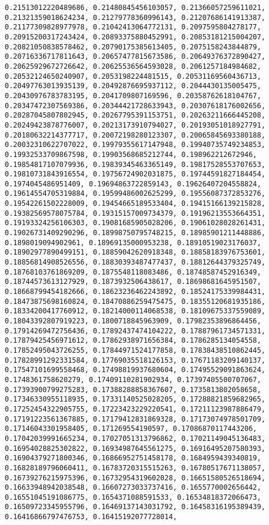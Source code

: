 \documentclass[11pt]{article}
\begin{document}
\begin{Verbatim}[commandchars=\\\{\}]
0.21513012220489686, 0.21480845456103057, 0.21366057259611021, 0.21321359018624234, 0.21279778360996143, 0.21207686141913387, 0.21177309828977978, 0.21042413064772131, 0.2097595804278177, 0.20915200317243424, 0.20893375880452991, 0.20853181215004207, 0.20821050838578462, 0.20790175385613405, 0.2075158243844879, 0.20716336717811643, 0.20657477815673586, 0.20649376372890427, 0.20625929672726642, 0.20625536564593028, 0.2061257184984682, 0.20532124650240907, 0.2053198224481515, 0.20531169560436713, 0.20497763013935139, 0.20492876695937112, 0.2044430135005475, 0.20430976783783195, 0.2041709807169596, 0.20358762618104767, 0.20347472307569386, 0.20344421728633943, 0.20307618176002656, 0.20287045807802945, 0.20267795391153751, 0.20263211666445208, 0.20249423878776007, 0.20213173910794027, 0.20193051018927791, 0.20180632214377717, 0.20072198280123307, 0.20065845693380188, 0.20032310622707022, 0.19979355617147948, 0.19940735749234853, 0.19932533709867598, 0.19903568685212744, 0.198962212672946, 0.19854817107079936, 0.19839345463365149, 0.19817528553707653, 0.19810731843916554, 0.19756724902031875, 0.19744591827184454, 0.1974045486951409, 0.19694863722859143, 0.19626407204558824, 0.19614554705319884, 0.19599486002625299, 0.19556087372853276, 0.19542261502228009, 0.19454665189533404, 0.19415166139215828, 0.19382569578075784, 0.19315157009734379, 0.19196213553664351, 0.19193324256106303, 0.19081685905028206, 0.19061028028261431, 0.19026731409290296, 0.18998750795748215, 0.18985901211448886, 0.1898019094902961, 0.18969135000953238, 0.18910519023176037, 0.18902977890499151, 0.18859042620918348, 0.18858183976753601, 0.18856814908526556, 0.18830393487477437, 0.18812644379325749, 0.18768103761869209, 0.1875548118083486, 0.18748587452916349, 0.18744573613127929, 0.1873932506438617, 0.18698681645951507, 0.18668799454182666, 0.18623236462243892, 0.18524175339984431, 0.18473875698160824, 0.18470886259475475, 0.18355120681935186, 0.18334200417760912, 0.18214000114068538, 0.18109675337559089, 0.18043392807919223, 0.1800718845963909, 0.17982353896864456, 0.17914269472756436, 0.17892437474104222, 0.17887961734571331, 0.17879425456971612, 0.17862938971656384, 0.1786285134054558, 0.17852495043726255, 0.17844971524177858, 0.17838438510862445, 0.17828991292331584, 0.17769035518126153, 0.17671183209140137, 0.17547101699558468, 0.17498819937680604, 0.17495529091863624, 0.1748361758620279, 0.17409110281902934, 0.17397405500707067, 0.17393900799275283, 0.17388288858367607, 0.1735813802058658, 0.17346330955118935, 0.17331140525028205, 0.17288821859682965, 0.17252454322905755, 0.17223423229220541, 0.17211123987886479, 0.17191223561367885, 0.17179412831869328, 0.17173074978501709, 0.17146043301958405, 0.171269554190597, 0.17086870117443206, 0.17042039991665234, 0.17027051313796862, 0.17021149045136483, 0.16954028825302822, 0.16934987645561275, 0.16916495207580393, 0.16904379271800346, 0.16866952751458178, 0.1684959439340819, 0.16828189796060411, 0.16783720315515263, 0.16780517671138057, 0.16739276215975396, 0.16732954319602028, 0.16651580526518694, 0.16633948942038548, 0.16607273033737416, 0.1655770002656442, 0.16551045191086775, 0.1654371088591533, 0.16534818372066473, 0.16509723345955796, 0.16469137143031792, 0.16458316195389439, 0.16416866797476753, 0.16415192077728014, 
\end{Verbatim}
\end{document}
